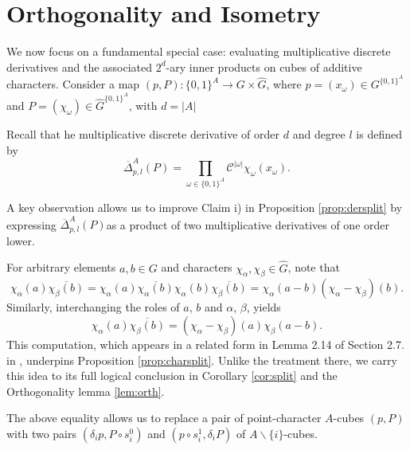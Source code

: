\documentclass{amsart}
\theoremstyle{definition}
\theoremstyle{remark}
\numberwithin{equation}{section}
\begin{document}
\section{Orthogonality and Isometry} %
\label{sec:orto-fin}

We now focus on a fundamental special case: evaluating multiplicative discrete derivatives and the associated $2^d$-ary inner products on cubes of additive characters. Consider a map $(p,P) : \{0,1\}^A \to G \times \widehat{G}$, where $p=(x_\omega)\in G^{\{0,1\}^A}$ and $P=(\chi_\omega) \in {\hat{G}}^{\{0,1\}^A}$, with $d=|A|$

Recall that he multiplicative discrete derivative of order $d$ and degree $l$ is defined by 
$$ \overline{\Delta}^A_{p,l} (P)  =  \prod_{\omega \in \{0,1\}^A} \mathcal{C}^{|\omega|} \chi_\omega (x_\omega).$$

A key observation allows us to improve Claim i) in Proposition \ref{prop:dersplit} by expressing $\overline{\Delta}^A_{p,l} (P)$as a product of two multiplicative derivatives of one order lower. 

For arbitrary elements $a,b \in G$ and characters $\chi_\alpha, \chi_\beta \in \widehat{G}$, note that   
$$\chi_{\alpha}(a)\overline{\chi_\beta(b)} = \chi_{\alpha}(a)\overline{\chi_{\alpha}(b)}\chi_\alpha(b)\overline{\chi_\beta(b)} = \chi_{\alpha}(a-b)\left(\chi_{\alpha} - \chi_\beta\right)(b).$$
Similarly,  interchanging the roles of $a$, $b$ and $\alpha$,  $\beta$, yields  
$$\chi_{\alpha}(a)\overline{\chi_\beta(b)}=\left(\chi_\alpha-\chi_\beta\right)(a)\chi_\beta(a-b).$$
This computation, which appears in a related form in Lemma 2.14 of Section 2.7. in \cite{Szeg12}, underpins Proposition \ref{prop:charsplit}. Unlike the treatment there, we carry this idea  to its full logical conclusion  in  Corollary \ref{cor:split} and the Orthogonality lemma \ref{lem:orth}.

The above equality allows us to replace a pair of  point-character $A$-cubes $(p, P )$ with two pairs $( \delta_i p, P \circ s_i^0 )$ and $(p \circ s_i^1  , \delta_i P)$ of $A \backslash \{i\}$-cubes.
\end{document}

